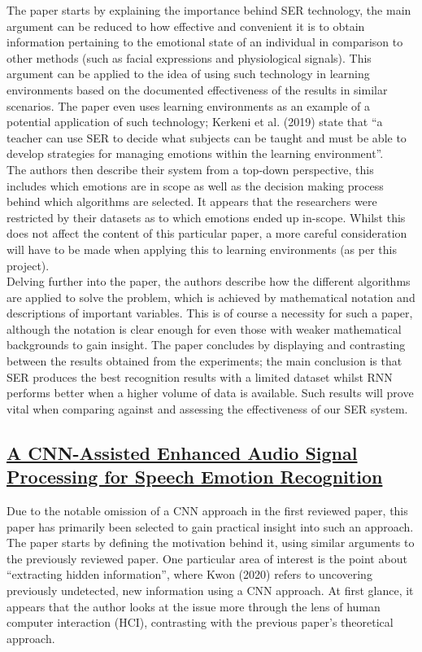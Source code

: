 \documentclass[12pt]{article}
\begin{document}
\noindent The paper starts by explaining the importance behind SER technology, the main argument can be reduced to how effective and convenient it is to obtain information pertaining to the emotional state of an individual in comparison to other methods (such as facial expressions and physiological signals). This argument can be applied to the idea of using such technology in learning environments based on the documented effectiveness of the results in similar scenarios. The paper even uses learning environments as an example of a potential application of such technology; Kerkeni et al. (2019) state that ``a teacher can use SER to decide what subjects can be taught and must be able to develop strategies for managing emotions within the learning environment''.
\\

\noindent The authors then describe their system from a top-down perspective, this includes which emotions are in scope as well as the decision making process behind which algorithms are selected. It appears that the researchers were restricted by their datasets as to which emotions ended up in-scope. Whilst this does not affect the content of this particular paper, a more careful consideration will have to be made when applying this to learning environments (as per this project).
\\

\noindent Delving further into the paper, the authors describe how the different algorithms are applied to solve the problem, which is achieved by mathematical notation and descriptions of important variables. This is of course a necessity for such a paper, although the notation is clear enough for even those with weaker mathematical backgrounds to gain insight. The paper concludes by displaying and contrasting between the results obtained from the experiments; the main conclusion is that SER produces the best recognition results with a limited dataset whilst RNN performs better when a higher volume of data is available. Such results will prove vital when comparing against and assessing the effectiveness of our SER system.

\subsection{\href{https://www.mdpi.com/1424-8220/20/1/183/pdf}{A CNN-Assisted Enhanced Audio Signal Processing for Speech Emotion Recognition}}
Due to the notable omission of a CNN approach in the first reviewed paper, this paper has primarily been selected to gain practical insight into such an approach. The paper starts by defining the motivation behind it, using similar arguments to the previously reviewed paper. One particular area of interest is the point about ``extracting hidden information'', where Kwon (2020) refers to uncovering previously undetected, new information using a CNN approach. At first glance, it appears that the author looks at the issue more through the lens of human computer interaction (HCI), contrasting with the previous paper's theoretical approach.
\\
\end{document}
